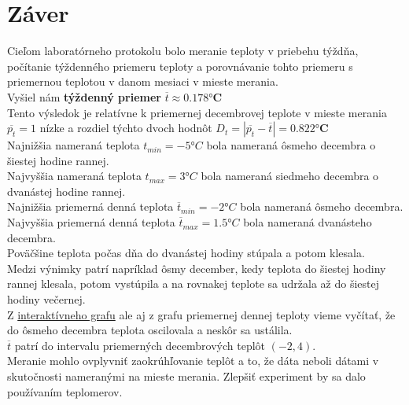 \documentclass{article}
\begin{document}
	\section{Záver}	
		Cieľom laboratórneho protokolu bolo meranie teploty v priebehu týždňa, počítanie týždenného priemeru teploty a porovnávanie tohto priemeru s priemernou teplotou v danom mesiaci v mieste merania.\\
		Vyšiel nám \textbf{týždenný priemer} $\overline{t} \approx \mathbf{0.178 °C}$\\
		Tento výsledok je relatívne k priemernej decembrovej teplote v mieste merania $\overline{p_t} = 1$ nízke a rozdiel týchto dvoch hodnôt $D_t = | \overline{p_t}-\overline{t}| = \mathbf{0.822 °C}$\\
		Najnižšia nameraná teplota $t_{min} = -5 °C$ bola nameraná ôsmeho decembra o šiestej hodine rannej.\\
		Najvyššia nameraná teplota $t_{max} = 3 °C $ bola nameraná siedmeho decembra o dvanástej hodine rannej.\\
		Najnižšia priemerná denná teplota $\overline{t}_{min} = -2 °C$ bola nameraná ôsmeho decembra.\\
		Najvyššia priemerná denná teplota $\overline{t}_{max} = 1.5 °C$ bola nameraná dvanásteho decembra.\\
		Poväčšine teplota počas dňa do dvanástej hodiny stúpala a potom klesala.\\
		Medzi výnimky patrí napríklad ôsmy december, kedy teplota do šiestej hodiny rannej klesala, potom vystúpila a na rovnakej teplote sa udržala až do šiestej hodiny večernej.\\
		Z \href{https://www.gtsforum.xyz/teploty}{interaktívneho grafu} ale aj z grafu priemernej dennej teploty vieme vyčítať, že do ôsmeho decembra teplota oscilovala a neskôr sa ustálila.\\
		$\overline{t}$ patrí do intervalu priemerných decembrových teplôt $\left(-2,4\right)$.\\
		Meranie mohlo ovplyvniť zaokrúhľovanie teplôt a to, že dáta neboli dátami v skutočnosti nameranými na mieste merania.
		Zlepšiť experiment by sa dalo používaním teplomerov.

		




	
\end{document}
